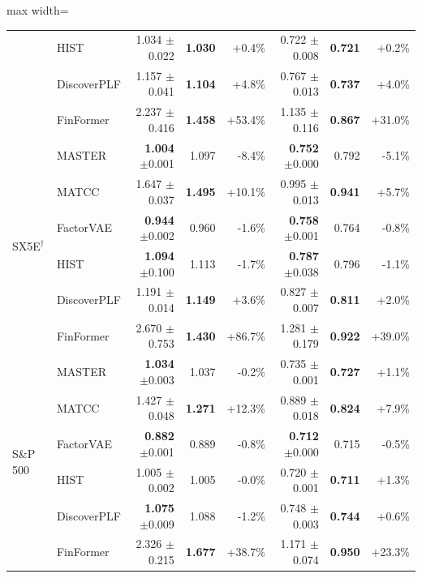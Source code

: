 \begin{table}[tb]
\begin{adjustbox}{max width=\textwidth}
{\begin{tabular}{llrrrrrr}
 & HIST & 1.034 {\scriptsize$\pm$0.022} & \textbf{1.030} & +0.4\% & 0.722 {\scriptsize$\pm$0.008} & \textbf{0.721} & +0.2\% \\
 & DiscoverPLF & 1.157 {\scriptsize$\pm$0.041} & \textbf{1.104} & +4.8\% & 0.767 {\scriptsize$\pm$0.013} & \textbf{0.737} & +4.0\% \\
 & FinFormer & 2.237 {\scriptsize$\pm$0.416} & \textbf{1.458} & +53.4\% & 1.135 {\scriptsize$\pm$0.116} & \textbf{0.867} & +31.0\% \\
\midrule
\multirow{6}{*}{SX5E$^\dagger$} & MASTER & \textbf{1.004} {\scriptsize$\pm$0.001} & 1.097 & -8.4\% & \textbf{0.752} {\scriptsize$\pm$0.000} & 0.792 & -5.1\% \\
 & MATCC & 1.647 {\scriptsize$\pm$0.037} & \textbf{1.495} & +10.1\% & 0.995 {\scriptsize$\pm$0.013} & \textbf{0.941} & +5.7\% \\
 & FactorVAE & \textbf{0.944} {\scriptsize$\pm$0.002} & 0.960 & -1.6\% & \textbf{0.758} {\scriptsize$\pm$0.001} & 0.764 & -0.8\% \\
 & HIST & \textbf{1.094} {\scriptsize$\pm$0.100} & 1.113 & -1.7\% & \textbf{0.787} {\scriptsize$\pm$0.038} & 0.796 & -1.1\% \\
 & DiscoverPLF & 1.191 {\scriptsize$\pm$0.014} & \textbf{1.149} & +3.6\% & 0.827 {\scriptsize$\pm$0.007} & \textbf{0.811} & +2.0\% \\
 & FinFormer & 2.670 {\scriptsize$\pm$0.753} & \textbf{1.430} & +86.7\% & 1.281 {\scriptsize$\pm$0.179} & \textbf{0.922} & +39.0\% \\
\midrule
\multirow{6}{*}{S\&P 500} & MASTER & \textbf{1.034} {\scriptsize$\pm$0.003} & 1.037 & -0.2\% & 0.735 {\scriptsize$\pm$0.001} & \textbf{0.727} & +1.1\% \\
 & MATCC & 1.427 {\scriptsize$\pm$0.048} & \textbf{1.271} & +12.3\% & 0.889 {\scriptsize$\pm$0.018} & \textbf{0.824} & +7.9\% \\
 & FactorVAE & \textbf{0.882} {\scriptsize$\pm$0.001} & 0.889 & -0.8\% & \textbf{0.712} {\scriptsize$\pm$0.000} & 0.715 & -0.5\% \\
 & HIST & 1.005 {\scriptsize$\pm$0.002} & 1.005 & -0.0\% & 0.720 {\scriptsize$\pm$0.001} & \textbf{0.711} & +1.3\% \\
 & DiscoverPLF & \textbf{1.075} {\scriptsize$\pm$0.009} & 1.088 & -1.2\% & 0.748 {\scriptsize$\pm$0.003} & \textbf{0.744} & +0.6\% \\
 & FinFormer & 2.326 {\scriptsize$\pm$0.215} & \textbf{1.677} & +38.7\% & 1.171 {\scriptsize$\pm$0.074} & \textbf{0.950} & +23.3\% \\

\end{tabular}}
\end{adjustbox}
\end{table}
